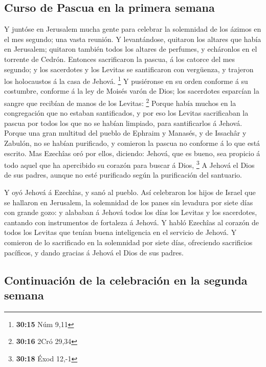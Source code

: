 \hypertarget{curso-de-pascua-en-la-primera-semana}{%
\subsection{Curso de Pascua en la primera
semana}\label{curso-de-pascua-en-la-primera-semana}}

 Y juntóse en Jerusalem mucha gente para celebrar la
solemnidad de los ázimos en el mes segundo; una vasta reunión.
 Y levantándose, quitaron los altares que había en
Jerusalem; quitaron también todos los altares de perfumes, y echáronlos
en el torrente de Cedrón.  Entonces sacrificaron la pascua,
á los catorce del mes segundo; y los sacerdotes y los Levitas se
santificaron con vergüenza, y trajeron los holocaustos á la casa de
Jehová. \footnote{\textbf{30:15} Núm 9,11}  Y pusiéronse en
su orden conforme á su costumbre, conforme á la ley de Moisés varón de
Dios; los sacerdotes esparcían la sangre que recibían de manos de los
Levitas: \footnote{\textbf{30:16} 2Cró 29,34}  Porque había
muchos en la congregación que no estaban santificados, y por eso los
Levitas sacrificaban la pascua por todos los que no se habían limpiado,
para santificarlos á Jehová.  Porque una gran multitud del
pueblo de Ephraim y Manasés, y de Issachâr y Zabulón, no se habían
purificado, y comieron la pascua no conforme á lo que está escrito. Mas
Ezechîas oró por ellos, diciendo: Jehová, que es bueno, sea propicio á
todo aquel que ha apercibido su corazón para buscar á Dios, \footnote{\textbf{30:18}
  Éxod 12,-1}  A Jehová el Dios de sus padres, aunque no
esté purificado según la purificación del santuario.

 Y oyó Jehová á Ezechîas, y sanó al pueblo. 
Así celebraron los hijos de Israel que se hallaron en Jerusalem, la
solemnidad de los panes sin levadura por siete días con grande gozo: y
alababan á Jehová todos los días los Levitas y los sacerdotes, cantando
con instrumentos de fortaleza á Jehová.  Y habló Ezechîas
al corazón de todos los Levitas que tenían buena inteligencia en el
servicio de Jehová. Y comieron de lo sacrificado en la solemnidad por
siete días, ofreciendo sacrificios pacíficos, y dando gracias á Jehová
el Dios de sus padres.

\hypertarget{continuaciuxf3n-de-la-celebraciuxf3n-en-la-segunda-semana}{%
\subsection{Continuación de la celebración en la segunda
semana}\label{continuaciuxf3n-de-la-celebraciuxf3n-en-la-segunda-semana}}

